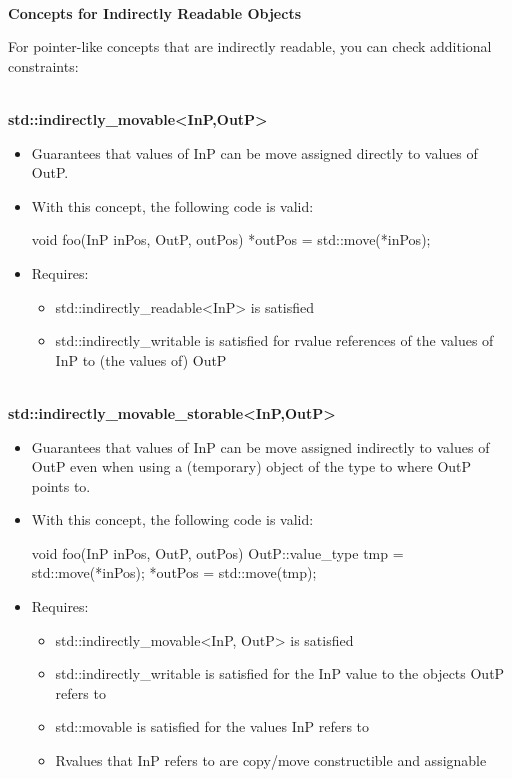\noindent
\hspace*{\fill} \\ %
\textbf{Concepts for Indirectly Readable Objects}

For pointer-like concepts that are indirectly readable, you can check additional constraints:

\noindent
\hspace*{\fill} \\ %
\textbf{std::indirectly\_movable<InP,OutP>}

\begin{itemize}
\item
Guarantees that values of InP can be move assigned directly to values of OutP.

\item
With this concept, the following code is valid:

\begin{cpp}
void foo(InP inPos, OutP, outPos) {
	*outPos = std::move(*inPos);
}
\end{cpp}

\item
Requires:
\begin{itemize}
\item
std::indirectly\_readable<InP> is satisfied

\item
std::indirectly\_writable is satisfied for rvalue references of the values of InP to (the values of) OutP
\end{itemize}
\end{itemize}

\noindent
\hspace*{\fill} \\ %
\textbf{std::indirectly\_movable\_storable<InP,OutP>}

\begin{itemize}
\item
Guarantees that values of InP can be move assigned indirectly to values of OutP even when using a (temporary) object of the type to where OutP points to.

\item
With this concept, the following code is valid:

\begin{cpp}
void foo(InP inPos, OutP, outPos) {
	OutP::value_type tmp = std::move(*inPos);
	*outPos = std::move(tmp);
}
\end{cpp}

\item
Requires:
\begin{itemize}
\item
std::indirectly\_movable<InP, OutP> is satisfied

\item
std::indirectly\_writable is satisfied for the InP value to the objects OutP refers to

\item
std::movable is satisfied for the values InP refers to

\item
Rvalues that InP refers to are copy/move constructible and assignable
\end{itemize}
\end{itemize}


